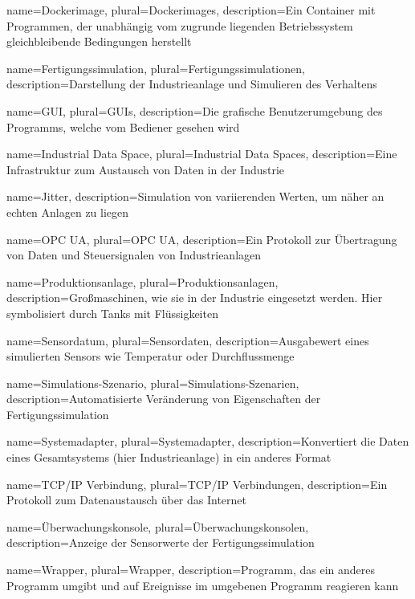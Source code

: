 
{
  name=Dockerimage,
  plural=Dockerimages,
  description={Ein Container mit Programmen, der unabhängig vom zugrunde liegenden Betriebssystem gleichbleibende Bedingungen herstellt}
}

{
  name=Fertigungssimulation,
  plural=Fertigungssimulationen,
  description={Darstellung der Industrieanlage und Simulieren des Verhaltens}
}


{
  name=GUI,
  plural=GUIs,
  description={Die grafische Benutzerumgebung des Programms, welche vom Bediener gesehen wird}
}

{
  name=Industrial Data Space,
  plural=Industrial Data Spaces,
  description={Eine Infrastruktur zum Austausch von Daten in der Industrie}
}

{
  name=Jitter,
  description={Simulation von variierenden Werten, um näher an echten Anlagen zu liegen}
}

{
  name=OPC UA,
  plural=OPC UA,
  description={Ein Protokoll zur Übertragung von Daten und Steuersignalen von Industrieanlagen}
}

{
  name=Produktionsanlage,
  plural=Produktionsanlagen,
  description={Großmaschinen, wie sie in der Industrie eingesetzt werden. Hier symbolisiert durch Tanks mit Flüssigkeiten}
}

{
  name=Sensordatum,
  plural=Sensordaten,
  description={Ausgabewert eines simulierten Sensors wie Temperatur oder Durchflussmenge}
}

{
  name=Simulations-Szenario,
  plural=Simulations-Szenarien,
  description={Automatisierte Veränderung von Eigenschaften der Fertigungssimulation}
}

{
  name=Systemadapter,
  plural=Systemadapter,
  description={Konvertiert die Daten eines Gesamtsystems (hier Industrieanlage) in ein anderes Format}
}

{
  name=TCP/IP Verbindung,
  plural=TCP/IP Verbindungen,
  description={Ein Protokoll zum Datenaustausch über das Internet}
}

{
  name=Überwachungskonsole,
  plural=Überwachungskonsolen,
  description={Anzeige der Sensorwerte der Fertigungssimulation}
}

{
  name=Wrapper,
  plural=Wrapper,
  description={Programm, das ein anderes Programm umgibt und auf Ereignisse im umgebenen Programm reagieren kann}
}
